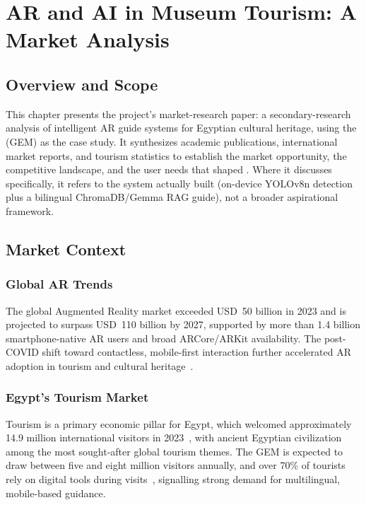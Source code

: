 \chapter{AR and AI in Museum Tourism: A Market Analysis}

\section{Overview and Scope}

This chapter presents the project's market-research paper: a secondary-research
analysis of intelligent AR guide systems for Egyptian cultural heritage, using the
\GEM{} (GEM) as the case study. It synthesizes academic publications, international
market reports, and tourism statistics to establish the market opportunity, the
competitive landscape, and the user needs that shaped \TimeLens{}. Where it discusses
\TimeLens{} specifically, it refers to the system actually built (on-device YOLOv8n
detection plus a bilingual ChromaDB/Gemma RAG guide), not a broader aspirational
framework.

\section{Market Context}

\subsection{Global AR Trends}
The global Augmented Reality market exceeded USD~50 billion in 2023 and is projected to
surpass USD~110 billion by 2027, supported by more than 1.4
billion smartphone-native AR users and broad ARCore/ARKit availability. The post-COVID
shift toward contactless, mobile-first interaction further accelerated AR adoption in
tourism and cultural heritage~\citep{PwCXR2023}.

\subsection{Egypt's Tourism Market}
Tourism is a primary economic pillar for Egypt, which welcomed approximately 14.9
million international visitors in 2023~\citep{UNWTO2024}, with ancient Egyptian
civilization among the most sought-after global tourism themes. The GEM is expected to
draw between five and eight million visitors annually, and over 70\% of tourists rely
on digital tools during visits~\citep{TGMEgypt2025}, signalling strong demand for
multilingual, mobile-based guidance.

